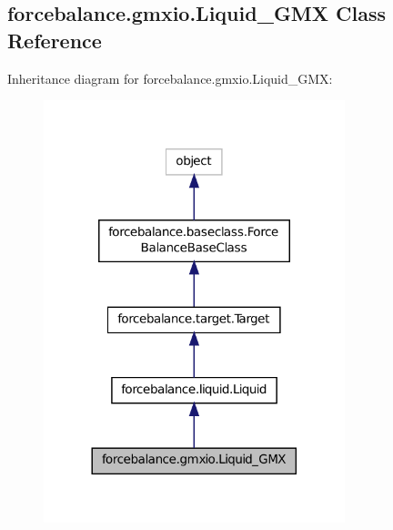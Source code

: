 \hypertarget{classforcebalance_1_1gmxio_1_1Liquid__GMX}{\subsection{forcebalance.\-gmxio.\-Liquid\-\_\-\-G\-M\-X Class Reference}
\label{classforcebalance_1_1gmxio_1_1Liquid__GMX}
}


Inheritance diagram for forcebalance.\-gmxio.\-Liquid\-\_\-\-G\-M\-X\-:
\nopagebreak
\begin{figure}[H]
\begin{center}
\leavevmode
\includegraphics[width=248pt]{classforcebalance_1_1gmxio_1_1Liquid__GMX__inherit__graph}
\end{center}
\end{figure}


